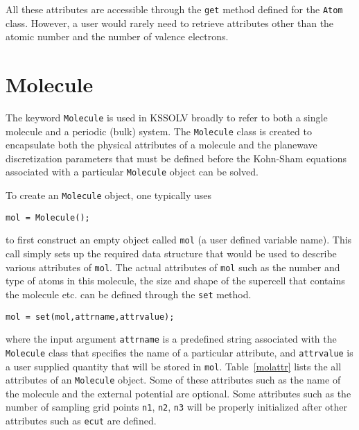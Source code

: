 \documentclass[11pt]{book}
\begin{document}
All these attributes are accessible through the {\tt get} method defined for
the {\tt Atom} class. However, a user would rarely need to retrieve attributes
other than the atomic number and the number of valence electrons.

\section{Molecule}
The keyword {\tt Molecule} is used in KSSOLV broadly to refer to both
a single molecule and a periodic (bulk) system.  The {\tt Molecule}
class is created to encapsulate both the physical attributes of a molecule 
and the planewave discretization parameters that must be 
defined before the Kohn-Sham equations associated with a particular 
{\tt Molecule} object can be solved. 

To create an {\tt Molecule} object, one typically uses
\begin{verbatim}
mol = Molecule();
\end{verbatim}
to first construct an empty object called {\tt mol} (a user defined variable 
name). This call simply sets up the required data structure that would be 
used to describe various attributes of {\tt mol}.
The actual attributes of {\tt mol} such as the number and type of atoms in 
this molecule, the size and shape of the supercell that contains the molecule 
etc. can be defined through the {\tt set} method.
\begin{verbatim}
mol = set(mol,attrname,attrvalue);
\end{verbatim}
where the input argument {\tt attrname} is a predefined string associated
with the {\tt Molecule} class that specifies the name of a particular 
attribute, and {\tt attrvalue} is a user supplied quantity that will 
be stored in {\tt mol}.  Table~\ref{molattr} lists the all attributes of an 
{\tt Molecule} object. Some of these attributes such as the name of the
molecule and the external potential are optional. Some attributes such as 
the number of sampling grid points {\tt n1}, {\tt n2}, {\tt n3} will be 
properly initialized after other attributes such as {\tt ecut} are defined.
%
\end{document}
